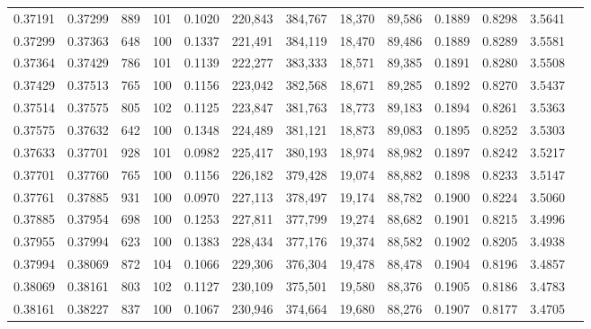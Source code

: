 \begin{tabular}{rrrrrrrrrrrrr}
0.37191 & 0.37299 &   889 & 101 &                                     0.1020 & 220,843 & 384,767 &  18,370 &  89,586 & 0.1889 & 0.8298 & 3.5641 \\
0.37299 & 0.37363 &   648 & 100 &                                     0.1337 & 221,491 & 384,119 &  18,470 &  89,486 & 0.1889 & 0.8289 & 3.5581 \\
0.37364 & 0.37429 &   786 & 101 &                                     0.1139 & 222,277 & 383,333 &  18,571 &  89,385 & 0.1891 & 0.8280 & 3.5508 \\
0.37429 & 0.37513 &   765 & 100 &                                     0.1156 & 223,042 & 382,568 &  18,671 &  89,285 & 0.1892 & 0.8270 & 3.5437 \\
0.37514 & 0.37575 &   805 & 102 &                                     0.1125 & 223,847 & 381,763 &  18,773 &  89,183 & 0.1894 & 0.8261 & 3.5363 \\
0.37575 & 0.37632 &   642 & 100 &                                     0.1348 & 224,489 & 381,121 &  18,873 &  89,083 & 0.1895 & 0.8252 & 3.5303 \\
0.37633 & 0.37701 &   928 & 101 &                                     0.0982 & 225,417 & 380,193 &  18,974 &  88,982 & 0.1897 & 0.8242 & 3.5217 \\
0.37701 & 0.37760 &   765 & 100 &                                     0.1156 & 226,182 & 379,428 &  19,074 &  88,882 & 0.1898 & 0.8233 & 3.5147 \\
0.37761 & 0.37885 &   931 & 100 &                                     0.0970 & 227,113 & 378,497 &  19,174 &  88,782 & 0.1900 & 0.8224 & 3.5060 \\
0.37885 & 0.37954 &   698 & 100 &                                     0.1253 & 227,811 & 377,799 &  19,274 &  88,682 & 0.1901 & 0.8215 & 3.4996 \\
0.37955 & 0.37994 &   623 & 100 &                                     0.1383 & 228,434 & 377,176 &  19,374 &  88,582 & 0.1902 & 0.8205 & 3.4938 \\
0.37994 & 0.38069 &   872 & 104 &                                     0.1066 & 229,306 & 376,304 &  19,478 &  88,478 & 0.1904 & 0.8196 & 3.4857 \\
0.38069 & 0.38161 &   803 & 102 &                                     0.1127 & 230,109 & 375,501 &  19,580 &  88,376 & 0.1905 & 0.8186 & 3.4783 \\
0.38161 & 0.38227 &   837 & 100 &                                     0.1067 & 230,946 & 374,664 &  19,680 &  88,276 & 0.1907 & 0.8177 & 3.4705 \\

\end{tabular}
